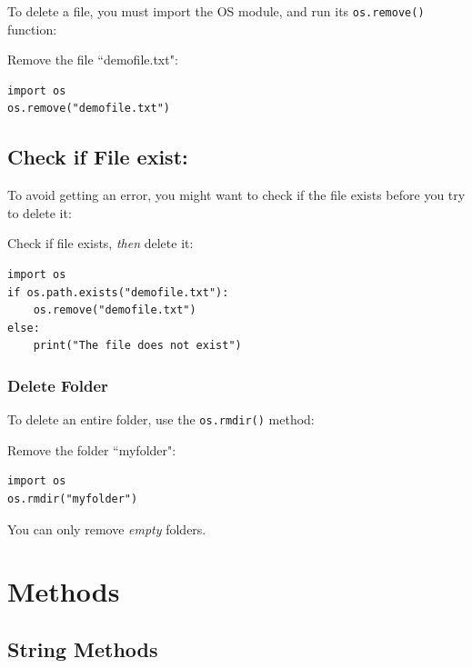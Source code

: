 \documentclass[12pt,a4paper]{article}
\newcommand{\code}[1]{%
	\colorbox{backcolour}{\lstinline{#1}}%
}
\begin{document}
To delete a file, you must import the OS module, and run its \code{os.remove()} function:

\begin{ebox}
Remove the file ``demofile.txt":
	\begin{lstlisting}
import os
os.remove("demofile.txt")
	\end{lstlisting}
\end{ebox}

\subsection{Check if File exist:}

To avoid getting an error, you might want to check if the file exists before
you try to delete it:

\begin{ebox}
Check if file exists, \textit{then} delete it:
	\begin{lstlisting}
import os
if os.path.exists("demofile.txt"):
    os.remove("demofile.txt")
else:
    print("The file does not exist")
	\end{lstlisting}
\end{ebox}

\subsubsection{Delete Folder}

To delete an entire folder, use the \code{os.rmdir()} method:

\begin{ebox}
Remove the folder ``myfolder":
	\begin{lstlisting}
import os
os.rmdir("myfolder")
	\end{lstlisting}
\end{ebox}

\begin{nbox}
You can only remove \textit{empty} folders.
\end{nbox}
\vfill\newpage
\section{Methods}
\subsection{String Methods}\label{pyStringMethod}
\end{document}
